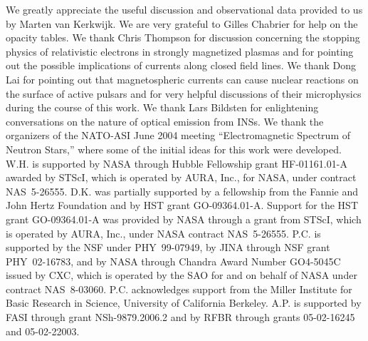 \documentclass[useAMS,usegraphicx]{mn2e}
\begin{document}
We greatly appreciate the useful discussion and observational data provided
to us by Marten van Kerkwijk.
We are very grateful to Gilles Chabrier for help on the opacity tables.
We thank Chris Thompson for discussion concerning the stopping physics
of relativistic electrons in strongly magnetized plasmas and for
pointing out the possible implications of currents along closed field
lines.
We thank Dong Lai for pointing out that magnetospheric currents can cause
nuclear reactions on the surface of active pulsars and for very helpful
discussions of their microphysics during the course of this work.  We
thank Lars Bildsten for enlightening conversations on the nature of
optical emission from INSs.
We thank the organizers of the NATO-ASI June 2004 meeting ``Electromagnetic
Spectrum of Neutron Stars,'' where some of the initial ideas for this work
were developed.
W.H. is supported by NASA through Hubble Fellowship grant HF-01161.01-A
awarded by STScI, which is operated by AURA, Inc., for NASA, under
contract NAS~5-26555.
D.K. was partially supported by a fellowship from the Fannie and John Hertz
Foundation and by HST grant GO-09364.01-A.
Support for the HST grant GO-09364.01-A was provided by NASA through a grant
from STScI, which is operated by AURA, Inc., under NASA contract NAS~5-26555.
P.C. is supported by the NSF under PHY~99-07949, by JINA through NSF grant
PHY~02-16783, and by NASA through Chandra Award Number GO4-5045C issued by
CXC, which is operated by the SAO for and on behalf of NASA under
contract NAS~8-03060.
P.C. acknowledges support from the Miller Institute for Basic Research
in Science, University of California Berkeley.
A.P. is supported by FASI through grant NSh-9879.2006.2 and by RFBR
through grants 05-02-16245 and 05-02-22003.
\end{document}
